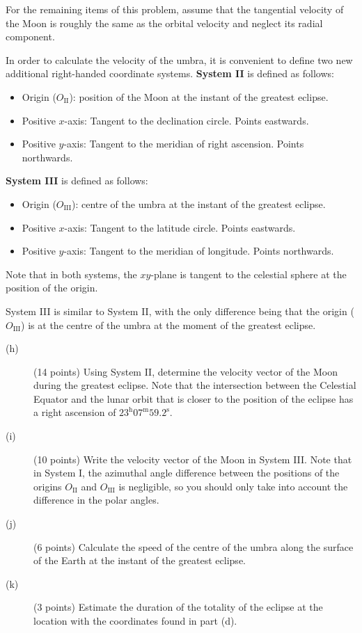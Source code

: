 For the remaining items of this problem, assume that the tangential velocity
of the Moon is roughly the same as the orbital velocity and neglect its
radial component.

In order to calculate the velocity of the umbra, it is convenient to define
two new additional right-handed coordinate systems. \textbf{System II} is
defined as follows:
\begin{itemize}
\item Origin ($O_{\mathrm{II}}$): position of the Moon at the instant of the
  greatest eclipse.
\item Positive $x$-axis: Tangent to the declination circle. Points
  eastwards.
\item Positive $y$-axis: Tangent to the meridian of right ascension. Points
  northwards.
\end{itemize}

\textbf{System III} is defined as follows:
\begin{itemize}
\item Origin ($O_{\mathrm{III}}$): centre of the umbra at the instant of the
  greatest eclipse.
\item Positive $x$-axis: Tangent to the latitude circle. Points eastwards.
\item Positive $y$-axis: Tangent to the meridian of longitude. Points
  northwards.
\end{itemize}

Note that in both systems, the $xy$-plane is tangent to the celestial sphere
at the position of the origin.

System III is similar to System II, with the only difference being that the
origin ($O_{\mathrm{III}}$) is at the centre of the umbra at the moment of
the greatest eclipse.

\begin{description}
\item[(h)] (14 points) Using System II, determine the velocity vector of the
  Moon during the greatest eclipse. Note that the intersection between the
  Celestial Equator and the lunar orbit that is closer to the position of the
  eclipse has a right ascension of
  $23^{\mathrm{h}}07^{\mathrm{m}}59.2^{\mathrm{s}}$.
\item[(i)] (10 points) Write the velocity vector of the Moon in System III.
  Note that in System I, the azimuthal angle difference between the positions
  of the origins $O_{\mathrm{II}}$ and $O_{\mathrm{III}}$ is negligible, so
  you should only take into account the difference in the polar angles.
\item[(j)] (6 points) Calculate the speed of the centre of the umbra along
  the surface of the Earth at the instant of the greatest eclipse.
\item[(k)] (3 points) Estimate the duration of the totality of the eclipse at
  the location with the coordinates found in part (d).
\end{description}

